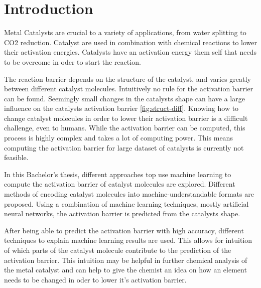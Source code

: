 
\chapter{Introduction}
\label{ch:Introduction}


Metal Catalysts are crucial to a variety of applications, from water splitting to CO2 reduction.
Catalyst are used in combination with chemical reactions to lower their activation energies.
Catalysts have an activation energy them self that needs to be overcome in oder to start the reaction.

The reaction barrier depends on the structure of the catalyst, and varies greatly between different catalyst molecules.
Intuitively no rule for the activation barrier can be found.
Seemingly small changes in the catalysts shape can have a large influence on the catalysts activation barrier \ref{fig:struct-diff}.
Knowing how to change catalyst molecules in order to lower their activation barrier is a difficult challenge, even to humans.
While the activation barrier can be computed, this process is highly complex and takes a lot of computing power.
This means computing the activation barrier for large dataset of catalysts is currently not feasible.

In this Bachelor's thesis, different approaches top use machine learning to compute the activation barrier of catalyst molecules are explored.
Different methods of encoding catalyst molecules into machine-understandable formats are proposed.
Using a combination of machine learning techniques, mostly artificial neural networks, the activation barrier is predicted from the catalysts shape.

After being able to predict the activation barrier with high accuracy, different techniques to explain machine learning results are used.
This allows for intuition of which parts of the catalyst molecule contribute to the prediction of the activation barrier.
This intuition may be helpful in further chemical analysis of the metal catalyst and can help to give the 
chemist an idea on how an element needs to be changed in oder to lower it's activation barrier.
\\


